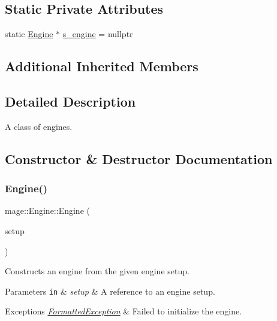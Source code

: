 \subsection*{Static Private Attributes}
\begin{DoxyCompactItemize}
\item 
static \hyperlink{classmage_1_1_engine}{Engine} $\ast$ \hyperlink{classmage_1_1_engine_a95fd10c9b9dfe0fc9cbbcb441c910240}{s\+\_\+engine} = nullptr
\end{DoxyCompactItemize}
\subsection*{Additional Inherited Members}


\subsection{Detailed Description}
A class of engines. 

\subsection{Constructor \& Destructor Documentation}
\hypertarget{classmage_1_1_engine_a99770cbb017b29c284d7f8e4c7e2b84c}{}\label{classmage_1_1_engine_a99770cbb017b29c284d7f8e4c7e2b84c} 
\subsubsection{\texorpdfstring{Engine()}{Engine()}\hspace{0.1cm}{\footnotesize\ttfamily [1/3]}}
{\footnotesize\ttfamily mage\+::\+Engine\+::\+Engine (\begin{DoxyParamCaption}\item[{const \hyperlink{structmage_1_1_engine_setup}{Engine\+Setup} \&}]{setup }\end{DoxyParamCaption})\hspace{0.3cm}{\ttfamily [explicit]}}

Constructs an engine from the given engine setup.


\begin{DoxyParams}[1]{Parameters}
\mbox{\tt in}  & {\em setup} & A reference to an engine setup. \\
\hline
\end{DoxyParams}

\begin{DoxyExceptions}{Exceptions}
{\em \hyperlink{structmage_1_1_formatted_exception}{Formatted\+Exception}} & Failed to initialize the engine. \\
\hline
\end{DoxyExceptions}
\hypertarget{classmage_1_1_engine_afd2f4f32b2e803f59521aafe1924f0ba}{}\label{classmage_1_1_engine_afd2f4f32b2e803f59521aafe1924f0ba} 
